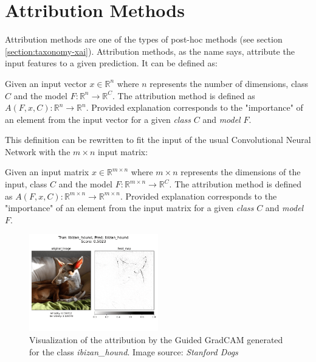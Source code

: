 


\section{Attribution Methods}


Attribution methods are one of the types of post-hoc methods (see section \ref{section:taxonomy-xai}). Attribution methods, as the name says, attribute the input features to a given prediction. It can be defined as:

\begin{definition}\label{def:attribution-method}
Given an input vector $x \in \mathbb{R}^n$ where $n$ represents the number of dimensions, class $C$ and the model $F: \mathbb{R}^{n} \rightarrow \mathbb{R}^C$. The attribution method is defined as $A(F, x, C): \mathbb{R}^{n} \rightarrow \mathbb{R}^{n}$. Provided explanation corresponds to the "importance" of an element from the input vector for a given \textit{class} $C$ and \textit{model} $F$.
\end{definition}

This definition can be rewritten to fit the input of the usual Convolutional Neural Network with the $m \times n$ input matrix:

\begin{definition}\label{def:attribution-method-cnn}
Given an input matrix $x \in \mathbb{R}^{m \times n}$ where $m \times n$ represents the dimensions of the input, class $C$ and the model $F: \mathbb{R}^{m \times n} \rightarrow \mathbb{R}^C$. The attribution method is defined as $A(F, x, C): \mathbb{R}^{m \times n} \rightarrow \mathbb{R}^{m \times n}$. Provided explanation corresponds to the "importance" of an element from the input matrix for a given \textit{class} $C$ and \textit{model} $F$.
\end{definition}

\begin{figure}
  \includegraphics[width=0.50\textwidth]{background/images/1280-Ibizan_hound-Ibizan_hound.png}
  \caption{Visualization of the attribution by the Guided GradCAM generated for the class \textit{ibizan\_hound}. Image source: \textit{Stanford Dogs} \cite{stanford-dogs}}\label{fig:gradcam-ibizan-hound}
  \vspace{-30mm}
\end{figure}


